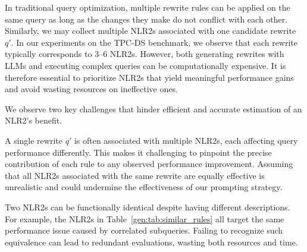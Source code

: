 





 In traditional query optimization, multiple rewrite rules can be applied on the same query as long as the changes they make do not conflict with each other. Similarly, we may collect multiple NLR2s associated with one candidate rewrite $q'$. In our experiments on the TPC-DS benchmark, we observe that each rewrite typically corresponds to 3–6 NLR2s. However, both generating rewrites with LLMs and executing complex queries can be computationally expensive. It is therefore essential to prioritize NLR2s that yield meaningful performance gains and avoid wasting resources on ineffective ones.

We observe two key challenges that hinder efficient and accurate estimation of an NLR2’s benefit.







 A single rewrite $q'$ is often associated with multiple NLR2s, each affecting query performance differently. This makes it challenging to pinpoint the precise contribution of each rule to any observed performance improvement. Assuming that all NLR2s associated with the same rewrite are equally effective is unrealistic and could undermine the  effectiveness of our prompting strategy.

 Two NLR2s can be functionally identical despite having different descriptions. For example, the NLR2s in Table~\ref{gen:tab:similar_rules} all target the same performance issue caused by correlated subqueries. Failing to recognize such equivalence can lead to redundant evaluations, wasting both resources and time.


